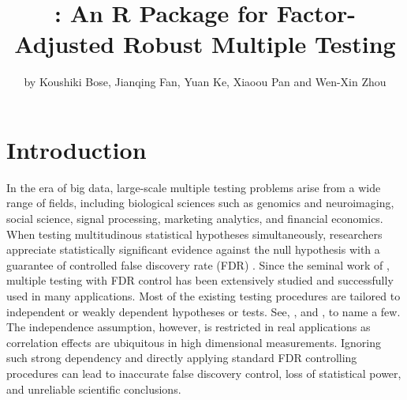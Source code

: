 \title{: An R Package for Factor-Adjusted Robust Multiple Testing}
\author{by Koushiki Bose, Jianqing Fan, Yuan Ke, Xiaoou Pan and Wen-Xin Zhou}

\maketitle             




\section[Introduction]{Introduction}

In the era of big data, large-scale multiple testing problems arise from a wide range of fields, including biological sciences such as genomics and neuroimaging, social science, signal processing,  marketing analytics, and financial economics. When testing multitudinous statistical hypotheses simultaneously, researchers appreciate statistically significant evidence against the null hypothesis with a guarantee of controlled false discovery rate (FDR) \citep{BH1995}. Since the seminal work of \cite{BH1995}, multiple testing with FDR control has been extensively studied and successfully used in many applications. 
 Most of the existing testing procedures are tailored to independent or weakly dependent hypotheses or tests. See, \cite{S2002}, \cite{GW2004} and \cite{LR2005}, to name a few.
The independence assumption, however, is restricted in real applications as correlation effects are ubiquitous in high dimensional measurements.   Ignoring such strong dependency and directly applying standard FDR controlling procedures can lead to inaccurate false discovery control, loss of statistical power, and unreliable scientific conclusions.


